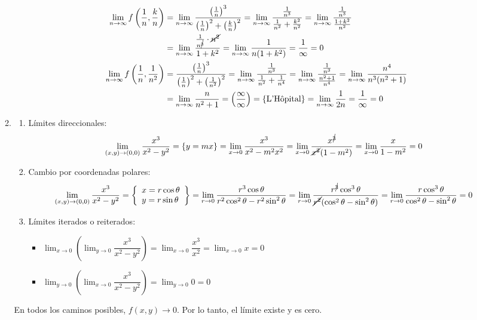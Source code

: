 \begin{enumerate}[label=\color{red}\textbf{\arabic*)}, leftmargin=*]
\begin{enumerate}[label=\color{red}\textbf{\alph*)}]
$$
\begin{aligned}
\lim_{ n \to \infty }f\left( \dfrac{1}{n},\dfrac{k}{n} \right)&=\lim_{ n \to \infty }\dfrac{\left( \frac{1}{n} \right)^{3}}{\left( \frac{1}{n} \right)^{2}+\left( \frac{k}{n} \right)^{2}}=\lim_{ n \to \infty }\dfrac{\frac{1}{n^{3}}}{\frac{1}{n^{2}}+\frac{k^{2}}{n^{2}}}=\lim_{ n \to \infty }\dfrac{\frac{1}{n^{3}}}{\frac{1+k^{2}}{n^{2}}}\\
&=\lim_{ n \to \infty }\dfrac{\frac{1}{n^{\cancel{3}}}\cdot \cancel{n^{2}}}{1+k^{2}}=\lim_{ n \to \infty }\dfrac{1}{n(1+k^{2})}=\dfrac{1}{\infty}=0\\
\lim_{ n \to \infty }f\left( \dfrac{1}{n},\dfrac{1}{n^{2}} \right)&=\dfrac{\left( \frac{1}{n} \right)^{3}}{\left( \frac{1}{n} \right)^{2}+\left( \frac{1}{n^{2}} \right)^{2}}=\lim_{ n \to \infty }\dfrac{\frac{1}{n^{3}}}{\frac{1}{n^{2}}+\frac{1}{n^4}}=\lim_{ n \to \infty }\dfrac{\frac{1}{n^{3}}}{\frac{n^{2}+1}{n^4}}=\lim_{ n \to \infty }\dfrac{n^4}{n^{3}(n^{2}+1)}\\
&=\lim_{ n \to \infty }\dfrac{n}{n^{2}+1}=\left( \dfrac{\infty}{\infty} \right)=\{ \text{L'Hôpital} \}=\lim_{ n \to \infty }\dfrac{1}{2n}=\dfrac{1}{\infty}=0
\end{aligned}
$$
\item {}
\begin{enumerate}[label=\arabic*)]
\item Límites direccionales:
$$
\lim_{ (x,y) \to (0,0) }\dfrac{x^{3}}{x^{2}-y^{2}}=\{ y=mx \}=\lim_{ x \to 0 }\dfrac{x^{3}}{x^{2}-m^{2}x^{2}}=\lim_{ x \to 0 }\dfrac{x^{\cancel{3}}}{\cancel{x^{2}}(1-m^{2})}=\lim_{ x \to 0 }\dfrac{x}{1-m^{2}}=0
$$
\item Cambio por coordenadas polares:
$$
\lim_{ (x,y) \to (0,0) }\dfrac{x^{3}}{x^{2}-y^{2}}=\left\{ \begin{array}{l}
x=r\cos\theta \\
y=r\sin\theta
\end{array} \right\}=\lim_{ r \to 0 }\dfrac{r^{3}\cos\theta}{r^{2}\cos ^{2}\theta-r^{2}\sin ^{2}\theta}=\lim_{ r \to 0 }\dfrac{r^{\cancel{3}}\cos ^{3}\theta}{\cancel{r^{2}}(\cos ^{2}\theta-\sin ^{2}\theta)}=\lim_{ r \to 0 }\dfrac{r\cos ^{3}\theta}{\cos ^{2}\theta-\sin ^{2}\theta}=0
$$
\item Límites iterados o reiterados:
\begin{itemize}[label=\textbullet]
\item $\lim_{ x \to 0 }\left( \lim_{ y \to 0 }\dfrac{x^{3}}{x^{2}-y^{2}} \right)=\lim_{ x \to 0 }\dfrac{x^{3}}{x^{2}}=\lim_{ x \to 0 }x=0$
\item $\lim_{ y \to 0 }\left( \lim_{ x \to 0 }\dfrac{x^{3}}{x^{2}-y^{2}} \right)=\lim_{ y \to 0 }0=0$
\end{itemize}
\end{enumerate}
En todos los caminos posibles, $f(x,y)\to 0$. Por lo tanto, el límite existe y es cero.


\end{enumerate}
\end{enumerate}
